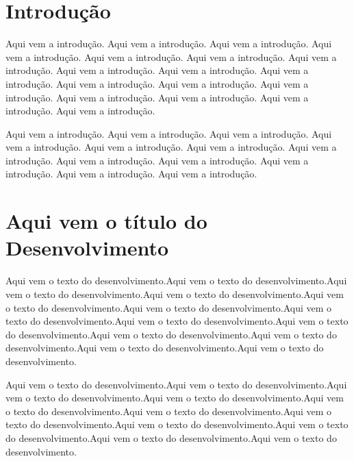 \documentclass[a4paper,12pt]{article}
\begin{document}
   \begin{center}
      \begin{tabular}{cp{12cm}}
%      
      
      \end{tabular}
   \end{center}
   \section{Introdução}
   Aqui vem a introdução. Aqui vem a introdução. Aqui vem a introdução. Aqui vem a introdução. Aqui vem a introdução. Aqui vem a introdução. Aqui vem a introdução. Aqui vem a introdução. Aqui vem a introdução. Aqui vem a introdução. Aqui vem a introdução. Aqui vem a introdução. Aqui vem a introdução. Aqui vem a introdução. Aqui vem a introdução. Aqui vem a introdução. Aqui vem a introdução. 
   
   Aqui vem a introdução. Aqui vem a introdução. Aqui vem a introdução. Aqui vem a introdução. Aqui vem a introdução. Aqui vem a introdução. Aqui vem a introdução. Aqui vem a introdução. Aqui vem a introdução. Aqui vem a introdução. Aqui vem a introdução. Aqui vem a introdução. 
   \section{Aqui vem o título do Desenvolvimento}
   Aqui vem o texto do desenvolvimento.Aqui vem o texto do desenvolvimento.Aqui vem o texto do desenvolvimento.Aqui vem o texto do desenvolvimento.Aqui vem o texto do desenvolvimento.Aqui vem o texto do desenvolvimento.Aqui vem o texto do desenvolvimento.Aqui vem o texto do desenvolvimento.Aqui vem o texto do desenvolvimento.Aqui vem o texto do desenvolvimento.Aqui vem o texto do desenvolvimento.Aqui vem o texto do desenvolvimento.Aqui vem o texto do desenvolvimento.
   
   Aqui vem o texto do desenvolvimento.Aqui vem o texto do desenvolvimento.Aqui vem o texto do desenvolvimento.Aqui vem o texto do desenvolvimento.Aqui vem o texto do desenvolvimento.Aqui vem o texto do desenvolvimento.Aqui vem o texto do desenvolvimento.Aqui vem o texto do desenvolvimento.Aqui vem o texto do desenvolvimento.Aqui vem o texto do desenvolvimento.Aqui vem o texto do desenvolvimento. 
   
\end{document}
